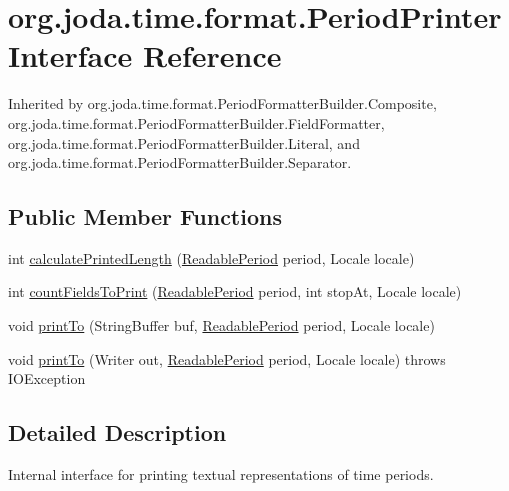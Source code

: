\hypertarget{interfaceorg_1_1joda_1_1time_1_1format_1_1_period_printer}{\section{org.\-joda.\-time.\-format.\-Period\-Printer Interface Reference}
\label{interfaceorg_1_1joda_1_1time_1_1format_1_1_period_printer}
}


Inherited by org.\-joda.\-time.\-format.\-Period\-Formatter\-Builder.\-Composite, org.\-joda.\-time.\-format.\-Period\-Formatter\-Builder.\-Field\-Formatter, org.\-joda.\-time.\-format.\-Period\-Formatter\-Builder.\-Literal, and org.\-joda.\-time.\-format.\-Period\-Formatter\-Builder.\-Separator.

\subsection*{Public Member Functions}
\begin{DoxyCompactItemize}
\item 
int \hyperlink{interfaceorg_1_1joda_1_1time_1_1format_1_1_period_printer_abe2b9fa359d2ec857d65803ef3e8a8e7}{calculate\-Printed\-Length} (\hyperlink{interfaceorg_1_1joda_1_1time_1_1_readable_period}{Readable\-Period} period, Locale locale)
\item 
int \hyperlink{interfaceorg_1_1joda_1_1time_1_1format_1_1_period_printer_a8b195910582fce46c82e207d183d7790}{count\-Fields\-To\-Print} (\hyperlink{interfaceorg_1_1joda_1_1time_1_1_readable_period}{Readable\-Period} period, int stop\-At, Locale locale)
\item 
void \hyperlink{interfaceorg_1_1joda_1_1time_1_1format_1_1_period_printer_a719233e1485c639b5f47a7c420d8e427}{print\-To} (String\-Buffer buf, \hyperlink{interfaceorg_1_1joda_1_1time_1_1_readable_period}{Readable\-Period} period, Locale locale)
\item 
void \hyperlink{interfaceorg_1_1joda_1_1time_1_1format_1_1_period_printer_aea939d73a4d4100ee39ff1bd2b40a8c0}{print\-To} (Writer out, \hyperlink{interfaceorg_1_1joda_1_1time_1_1_readable_period}{Readable\-Period} period, Locale locale)  throws I\-O\-Exception
\end{DoxyCompactItemize}


\subsection{Detailed Description}
Internal interface for printing textual representations of time periods. 

